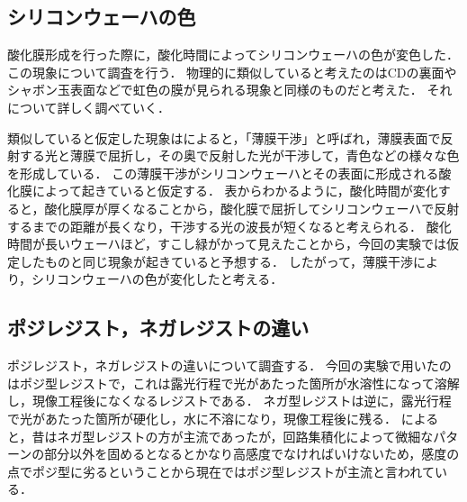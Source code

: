 \documentclass[11pt]{jarticle}
\begin{document}
	\subsection{シリコンウェーハの色}
		酸化膜形成を行った際に，酸化時間によってシリコンウェーハの色が変色した．
		この現象について調査を行う．
		物理的に類似していると考えたのはCDの裏面やシャボン玉表面などで虹色の膜が見られる現象と同様のものだと考えた．
		それについて詳しく調べていく．

		類似していると仮定した現象は\cite{ref:薄膜干渉}によると，「薄膜干渉」と呼ばれ，薄膜表面で反射する光と薄膜で屈折し，その奥で反射した光が干渉して，青色などの様々な色を形成している．
		この薄膜干渉がシリコンウェーハとその表面に形成される酸化膜によって起きていると仮定する．
		表からわかるように，酸化時間が変化すると，酸化膜厚が厚くなることから，酸化膜で屈折してシリコンウェーハで反射するまでの距離が長くなり，干渉する光の波長が短くなると考えられる．
		酸化時間が長いウェーハほど，すこし緑がかって見えたことから，今回の実験では仮定したものと同じ現象が起きていると予想する．
		したがって，薄膜干渉により，シリコンウェーハの色が変化したと考える．

	\subsection{ポジレジスト，ネガレジストの違い}
		ポジレジスト，ネガレジストの違いについて調査する．
		今回の実験で用いたのはポジ型レジストで，これは露光行程で光があたった箇所が水溶性になって溶解し，現像工程後になくなるレジストである．
		ネガ型レジストは逆に，露光行程で光があたった箇所が硬化し，水に不溶になり，現像工程後に残る．
		\cite{ref:ネガポジ}によると，昔はネガ型レジストの方が主流であったが，回路集積化によって微細なパターンの部分以外を固めるとなるとかなり高感度でなければいけないため，感度の点でポジ型に劣るということから現在ではポジ型レジストが主流と言われている．
\end{document}
